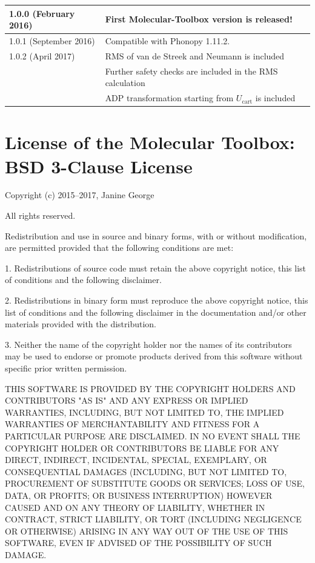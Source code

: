 \documentclass[12pt,a4paper]{article}
\begin{document}
 \begin{center}
\begin{tabular}{|l|l|}\hline
1.0.0 (February 2016)& First Molecular-Toolbox version is released! \\ \hline
1.0.1 (September 2016)& Compatible with Phonopy 1.11.2.\\ \hline
1.0.2 (April 2017) & RMS of van de Streek and Neumann is included \\
                   & Further safety checks are included in the RMS calculation \\
                   & ADP transformation starting from $U_{\mathrm{cart}}$ is included \\  \hline           
 \end{tabular}
 \end{center}

 \newpage
\section{License of the Molecular Toolbox: BSD 3-Clause License}

\begin{framed}\raggedright{Copyright (c) 2015--2017, Janine George

All rights reserved.

Redistribution and use in source and binary forms, with or without modification, are permitted provided that the following conditions are met:

1. Redistributions of source code must retain the above copyright notice, this list of conditions and the following disclaimer.

2. Redistributions in binary form must reproduce the above copyright notice, this list of conditions and the following disclaimer in the documentation and/or other materials provided with the distribution.

3. Neither the name of the copyright holder nor the names of its contributors may be used to endorse or promote products derived from this software without specific prior written permission.

THIS SOFTWARE IS PROVIDED BY THE COPYRIGHT HOLDERS AND CONTRIBUTORS "AS IS" AND ANY EXPRESS OR IMPLIED WARRANTIES, INCLUDING, BUT NOT LIMITED TO, THE IMPLIED WARRANTIES OF MERCHANTABILITY AND FITNESS FOR A PARTICULAR PURPOSE ARE DISCLAIMED. IN NO EVENT SHALL THE COPYRIGHT HOLDER OR CONTRIBUTORS BE LIABLE FOR ANY DIRECT, INDIRECT, INCIDENTAL, SPECIAL, EXEMPLARY, OR CONSEQUENTIAL DAMAGES (INCLUDING, BUT NOT LIMITED TO, PROCUREMENT OF SUBSTITUTE GOODS OR SERVICES; LOSS OF USE, DATA, OR PROFITS; OR BUSINESS INTERRUPTION) HOWEVER CAUSED AND ON ANY THEORY OF LIABILITY, WHETHER IN CONTRACT, STRICT LIABILITY, OR TORT (INCLUDING NEGLIGENCE OR OTHERWISE) ARISING IN ANY WAY OUT OF THE USE OF THIS SOFTWARE, EVEN IF ADVISED OF THE POSSIBILITY OF SUCH DAMAGE.}\end{framed}


\newpage
 
\end{document}
